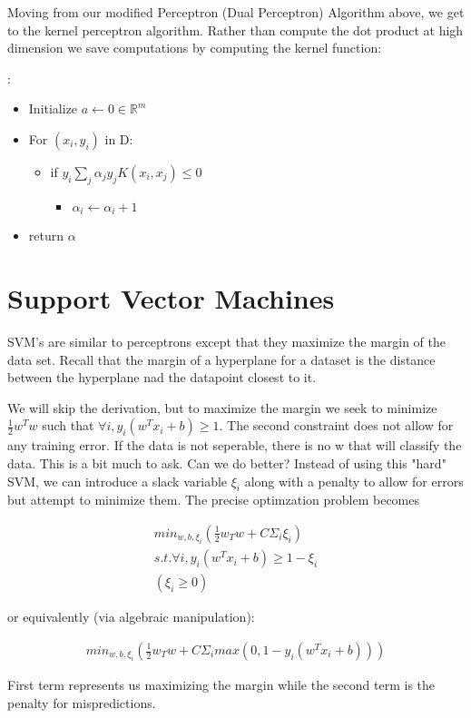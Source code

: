 Moving from our modified Perceptron (Dual Perceptron) Algorithm above, we get to the kernel perceptron algorithm. Rather than compute the dot product at high dimension we save computations by computing the kernel function:

:
\begin{itemize}
    \item Initialize $a \leftarrow 0 \in \mathbb{R}^{m}$
    \item For $(x_i, y_i)$ in D:
    \begin{itemize}
        \item if $y_i \sum_j \alpha_j y_j K(x_i, x_j) \leq 0$
        \begin{itemize}
            \item $\alpha_i \leftarrow \alpha_i + 1$
        \end{itemize}
    \end{itemize}
    \item return $\alpha$
\end{itemize}

\section{Support Vector Machines}
SVM's are similar to perceptrons except that they maximize the margin of the data set. Recall that the margin of a hyperplane for a dataset is the distance between the hyperplane nad the datapoint closest to it.

We will skip the derivation, but to maximize the margin we seek to minimize $\frac{1}{2}w^Tw$ such that $\forall i, y_i(w^Tx_i + b) \ge 1$. The second constraint does not allow for any training error. If the data is not seperable, there is no w that will classify the data. This is a bit much to ask. Can we do better? Instead of using this "hard" SVM, we can introduce a slack variable $\xi_i$ along with a penalty to allow for errors but attempt to minimize them. The precise optimzation problem becomes

\begin{gather*}
    min_{w, b, \xi_i}(\frac{1}{2}w_Tw + C\Sigma_i \xi_i) \\
    s.t. \forall i, y_i(w^Tx_i + b) \ge 1 - \xi_i \\
    (\xi_i \ge 0)
\end{gather*}

or equivalently (via algebraic manipulation)$: $

\begin{gather*}
    min_{w, b, \xi_i}(\frac{1}{2}w_Tw + C\Sigma_i max(0, 1-y_i(w^Tx_i + b))) 
\end{gather*}

First term represents us maximizing the margin while the second term is the penalty for mispredictions.